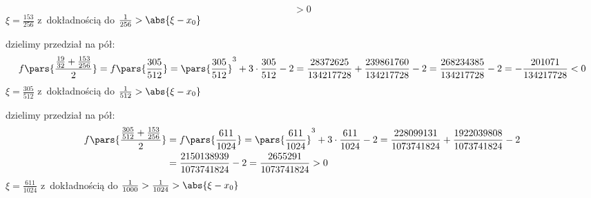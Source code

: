 \begin{proofcases}
\begin{equation*}
                > 0
        \end{equation*}
        \(\xi = \frac{153}{256}\) z~dokładnością do \(\frac{1}{256} > \abs{\xi - x_0}\)
    \item dzielimy przedział na pół:
        \begin{equation*}
            f\pars{\frac{\frac{19}{32} + \frac{153}{256}}{2}}
                = f\pars{\frac{305}{512}}
                = \pars{\frac{305}{512}}^3 + 3 \cdot \frac{305}{512} - 2
                = \frac{28372625}{134217728} + \frac{239861760}{134217728} - 2
                = \frac{268234385}{134217728} - 2
                = -\frac{201071}{134217728}
                < 0
        \end{equation*}
        \(\xi = \frac{305}{512}\) z~dokładnością do \(\frac{1}{512} > \abs{\xi - x_0}\)
    \item dzielimy przedział na pół:
        \begin{equation*}
            \begin{split}
                f\pars{\frac{\frac{305}{512} + \frac{153}{256}}{2}}
                    &= f\pars{\frac{611}{1024}}
                    = \pars{\frac{611}{1024}}^3 + 3 \cdot \frac{611}{1024} - 2
                    = \frac{228099131}{1073741824} + \frac{1922039808}{1073741824} - 2\\
                    &= \frac{2150138939}{1073741824} - 2
                    = \frac{2655291}{1073741824}
                    > 0
            \end{split}
        \end{equation*}
        \(\xi = \frac{611}{1024}\) z~dokładnością do \(\frac{1}{1000} > \frac{1}{1024} > \abs{\xi - x_0}\)
\end{proofcases}

